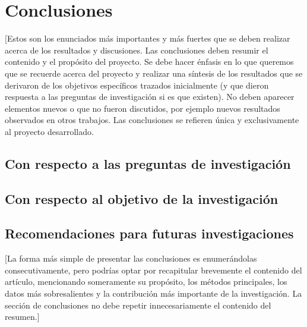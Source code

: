 \chapter{Conclusiones}\label{conclusiones}
[Estos son los enunciados más importantes y más fuertes que se deben realizar acerca de los resultados y discusiones. Las conclusiones deben resumir el contenido y el propósito del proyecto. Se debe hacer énfasis en lo que queremos que se recuerde acerca del proyecto y realizar una síntesis de los resultados que se derivaron de los objetivos específicos trazados inicialmente (y que dieron respuesta a las preguntas de investigación si es que existen). No deben aparecer elementos nuevos o que no fueron discutidos, por ejemplo nuevos resultados observados en otros trabajos. Las conclusiones se refieren única y exclusivamente al proyecto desarrollado.
 
\section{Con respecto a las preguntas de investigación}
\section{Con respecto al objetivo de la investigación}
\section{Recomendaciones para futuras investigaciones}
[La forma más simple de presentar las conclusiones es enumerándolas consecutivamente, pero podrías optar por recapitular brevemente el contenido del artículo, mencionando someramente su propósito, los métodos principales, los datos más sobresalientes y la contribución más importante de la investigación. La sección de conclusiones no debe repetir innecesariamente el contenido del resumen.]


